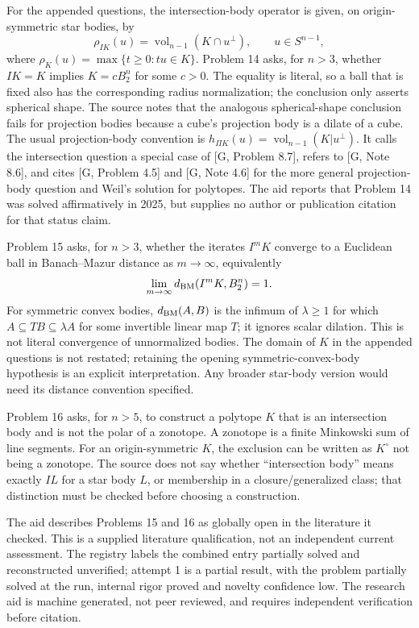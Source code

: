 \documentclass[11pt]{article}
\begin{document}
For the appended questions, the intersection-body operator is given, on origin-symmetric star bodies, by
\[
\rho_{IK}(u)=\operatorname{vol}_{n-1}(K\cap u^\perp),\qquad u\in S^{n-1},
\]
where \(\rho_K(u)=\max\{t\ge0:tu\in K\}\). Problem 14 asks, for \(n>3\), whether \(IK=K\) implies \(K=cB_2^n\) for some \(c>0\). The equality is literal, so a ball that is fixed also has the corresponding radius normalization; the conclusion only asserts spherical shape. The source notes that the analogous spherical-shape conclusion fails for projection bodies because a cube's projection body is a dilate of a cube. The usual projection-body convention is \(h_{\Pi K}(u)=\operatorname{vol}_{n-1}(K|u^\perp)\). It calls the intersection question a special case of [G, Problem 8.7], refers to [G, Note 8.6], and cites [G, Problem 4.5] and [G, Note 4.6] for the more general projection-body question and Weil's solution for polytopes. The aid reports that Problem 14 was solved affirmatively in 2025, but supplies no author or publication citation for that status claim.

Problem 15 asks, for \(n>3\), whether the iterates \(I^mK\) converge to a Euclidean ball in Banach--Mazur distance as \(m\to\infty\), equivalently
\[
\lim_{m\to\infty}d_{\rm BM}(I^mK,B_2^n)=1.
\]
For symmetric convex bodies, \(d_{\rm BM}(A,B)\) is the infimum of \(\lambda\ge1\) for which \(A\subseteq TB\subseteq\lambda A\) for some invertible linear map \(T\); it ignores scalar dilation. This is not literal convergence of unnormalized bodies. The domain of \(K\) in the appended questions is not restated; retaining the opening symmetric-convex-body hypothesis is an explicit interpretation. Any broader star-body version would need its distance convention specified.

Problem 16 asks, for \(n>5\), to construct a polytope \(K\) that is an intersection body and is not the polar of a zonotope. A zonotope is a finite Minkowski sum of line segments. For an origin-symmetric \(K\), the exclusion can be written as \(K^\circ\) not being a zonotope. The source does not say whether ``intersection body'' means exactly \(IL\) for a star body \(L\), or membership in a closure/generalized class; that distinction must be checked before choosing a construction.

The aid describes Problems 15 and 16 as globally open in the literature it checked. This is a supplied literature qualification, not an independent current assessment. The registry labels the combined entry partially solved and reconstructed unverified; attempt 1 is a partial result, with the problem partially solved at the run, internal rigor proved and novelty confidence low. The research aid is machine generated, not peer reviewed, and requires independent verification before citation.
\end{document}
